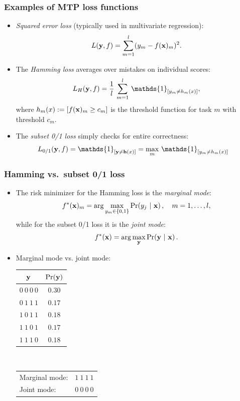 \documentclass[11pt,compress,t,notes=noshow, xcolor=table]{beamer}
\begin{document}
\begin{frame}
	\frametitle{Examples of MTP loss functions}
	\begin{itemize}
		
		\small 
		\item \emph{Squared error loss} (typically used in multivariate regression):
		$$
		L(\mathbf{y}, f) = \sum_{m=1}^l (y_m - f(\mathbf{x})_m)^2.
		$$
		\vspace{10pt}
		
		\item The \emph{Hamming loss} averages over mistakes on individual scores:    
		$$
		\displaystyle L_H(\yv, f) = \frac{1}{l}  \, \sum_{m=1}^l \, \mathds{1}_{[y_m \neq h_m(x)]},
		$$
        where $h_m(x) := [f(\mathbf{x})_m \geq c_m]$ is the threshold function for task $m$ with threshold $c_m$.
        \vspace{10pt}
		
		\item The \emph{subset 0/1 loss} simply checks for entire correctness:  
		\begin{align*}
			\displaystyle L_{0/1}(\yv, f) & = \mathds{1}_{[ \yv \neq \mathbf{h}(x) ]}  =  \max_m \, \mathds{1}_{[y_m \neq  h_m(x)]}
		\end{align*}
		
		
	\end{itemize}
\end{frame}



\begin{frame}
	\frametitle{Hamming vs.\ subset 0/1 loss}
	\begin{itemize}
		\item The risk minimizer for the Hamming loss is the  \emph{marginal mode}:
		$$
		f^*(\mathbf{x})_m = \arg \max_{y_m \in \{0,1\}} \Pr( y_j  ~|~ \mathbf{x} )\,, \quad m = 1,\ldots,l,
		$$
		while for the subset 0/1 loss it is the \emph{joint mode}:
		$$
		f^*(\mathbf{x}) = \arg \max_{\mathbf{y}} \Pr(\mathbf{y} ~|~ \mathbf{x}) \,.
		$$
		\item Marginal mode vs. joint mode:\\[6pt]
		\begin{center}
			\begin{tabular}{@{}cc@{}}
				\toprule
				$\mathbf{y}$ & $\Pr(\mathbf{y})$ \\
				\hline
				$0~0~0~0$ & $0.30$ \\
				$0~1~1~1$ & $0.17$ \\
				$1~0~1~1$ & $0.18$ \\
				$1~1~0~1$ & $0.17$ \\
				$1~1~1~0$ & $0.18$ \\
				\toprule
			\end{tabular}
			$\qquad$
			\footnotesize{
				\begin{tabular}{lr}
					Marginal mode: & $1~1~1~1$ \\
					Joint mode: & $0~0~0~0$ \\
				\end{tabular}
			}
		\end{center}
	\end{itemize}
\end{frame}
\end{document}
